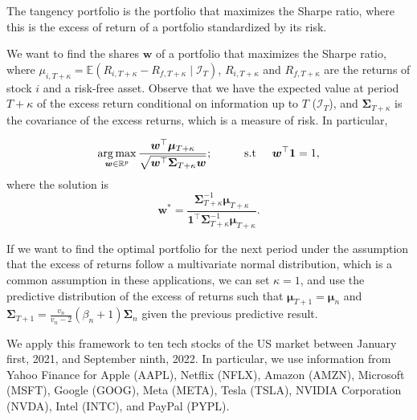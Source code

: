 \begin{enumerate}
The tangency portfolio is the portfolio that maximizes the Sharpe ratio, where this is the excess of return of a portfolio standardized by its risk. 

We want to find the shares ${\bm w}$ of a portfolio that maximizes the Sharpe ratio, where $\mu_{i,T+\kappa}=\mathbb{E}(R_{i,T+\kappa}-R_{f,T+\kappa}\mid \mathcal{I}_T)$, $R_{i,T+\kappa}$ and $R_{f,T+\kappa}$ are the returns of stock $i$ and a risk-free asset. Observe that we have the expected value at period $T+\kappa$ of the excess return conditional on information up to $T$ ($\mathcal{I}_T$), and ${\bm{\Sigma}}_{T+\kappa}$ is the covariance of the excess returns, which is a measure of risk. In particular, 

\begin{equation*}
	\operatorname*{arg\,max}_{{\bm w}\in \mathbb{R}^{p}} \frac{{\bm w}^{\top}\bm{\mu}_{T+\kappa}}{\sqrt{{\bm w}^{\top}{\bm{\Sigma}}_{T+\kappa} {\bm w}}}; \hspace{1cm} \text{s.t}\hspace{.5cm} {\bm w}^{\top}{\bm{1}}=1,
\end{equation*}
where the solution is
\begin{equation*}
	{\bm w}^*=\frac{{\bm{\Sigma}}^{-1}_{T+\kappa}\bm{\mu}_{T+\kappa}}{{\bm{1}}^{\top}{\bm \Sigma}^{-1}_{T+\kappa}\bm{\mu}_{T+\kappa}}.
\end{equation*}

If we want to find the optimal portfolio for the next period under the assumption that the excess of returns follow a multivariate normal distribution, which is a common assumption in these applications, we can set $\kappa=1$, and use the predictive distribution of the excess of returns such that $\bm\mu_{T+1}=\bm\mu_n$ and ${\bm{\Sigma}}_{T+1}=\frac{v_n}{v_n-2}(\beta_n+1){\bm{\Sigma}}_n$ given the previous predictive result.

We apply this framework to ten tech stocks of the US market between January first, 2021, and September ninth, 2022. In particular, we use information from Yahoo Finance for Apple (AAPL), Netflix (NFLX), Amazon (AMZN), Microsoft (MSFT), Google (GOOG), Meta (META), Tesla (TSLA), NVIDIA Corporation (NVDA), Intel (INTC), and PayPal (PYPL).


\end{enumerate}
